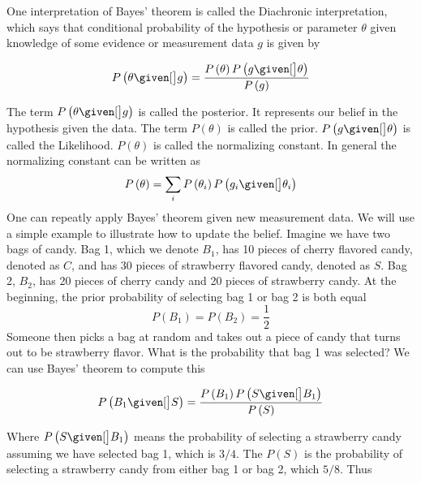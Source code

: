 One interpretation of Bayes' theorem is called the Diachronic interpretation, which says that conditional probability of the hypothesis or parameter $\theta$ given knowledge of some evidence or measurement data $g$ is given by 

\begin{equation}
	P \left( \theta \given[\big] g \right) = \frac{ P \left( \theta \right) P \left( g \given[\big] \theta \right) }{ P \left( g \right) }
	\label{eq:diachronic}
\end{equation}

The term $ P \left( \theta \given[\big] g \right) $ is called the posterior. It represents our belief in the hypothesis given the data. The term $ P \left( \theta \right) $ is called the prior. $P \left( g \given[\big] \theta \right)$ is called the Likelihood. $P \left( \theta \right)$ is called the normalizing constant. In general the normalizing constant can be written as 
\begin{equation}
P \left( \theta \right) = \sum_{i} P \left( \theta_i \right) P \left( g_i \given[\big] \theta_i \right)
\label{eq:normalizingConstant}
\end{equation}
One can repeatly apply Bayes' theorem given new measurement data. We will use a simple example to illustrate how to update the belief. Imagine we have two bags of candy. Bag 1, which we denote $B_1$, has 10 pieces of cherry flavored candy, denoted as $C$, and has 30 pieces of strawberry flavored candy, denoted as $S$. Bag 2, $B_2$, has 20 pieces of cherry candy and 20 pieces of strawberry candy. At the beginning, the prior probability of selecting bag 1 or bag 2 is both equal
\begin{equation}
	P \left( B_1 \right) = P \left( B_2 \right) = \frac{1}{2}
\end{equation}
Someone then picks a bag at random and takes out a piece of candy that turns out to be strawberry flavor. What is the probability that bag 1 was selected? We can use Bayes' theorem to compute this

\begin{equation}
	P \left( B_1 \given[\big] S \right) = \frac{ P \left( B_1 \right) P \left( S \given[\big] B_1 \right) }{ P \left( S \right) }
\end{equation}

Where $ P \left( S \given[\big] B_1 \right) $ means the probability of selecting a strawberry candy assuming we have selected bag 1, which is $3/4$. The $ P \left( S \right) $ is the probability of selecting a strawberry candy from either bag 1 or bag 2, which $5/8$. Thus

